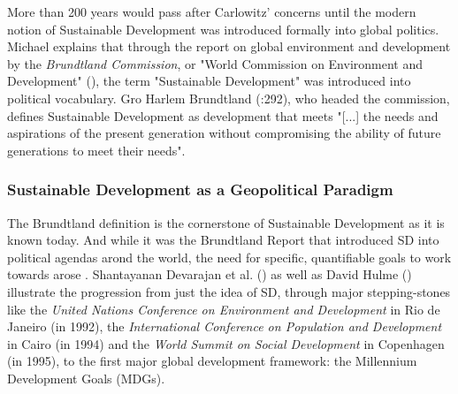 		        More than 200 years would pass after Carlowitz' concerns until the modern notion of Sustainable Development was introduced formally into global politics. Michael \citet{redclift2005} explains that through the report on global environment and development by the \textit{Brundtland Commission}, or "World Commission on Environment and Development" (\citeyear{wced1987}), the term "Sustainable Development" was introduced into political vocabulary. Gro Harlem Brundtland (\citeyear{brundtland1987}:292),  who headed the commission, defines Sustainable Development as development that meets "[...] the needs and aspirations of the present generation without compromising the ability of future generations to meet their needs".
		        
		        
		    
		    \subsubsection{Sustainable Development as a Geopolitical Paradigm}
		        The Brundtland definition is the cornerstone of Sustainable Development as it is known today. And while it was the Brundtland Report that introduced SD into political agendas arond the world, the need for specific, quantifiable goals to work towards arose \citep{dupisani2006}. Shantayanan Devarajan et al. (\citeyear{devarajan2002}) as well as David Hulme (\citeyear{hulme2009}) illustrate the progression from just the idea of SD, through major stepping-stones like the \textit{United Nations Conference on Environment and Development} in Rio de Janeiro (in 1992), the \textit{International Conference on Population and Development} in Cairo (in 1994) and the \textit{World Summit on Social Development} in Copenhagen (in 1995), to the first major global development framework: the Millennium Development Goals (MDGs).
		        
		        \medskip
		        
